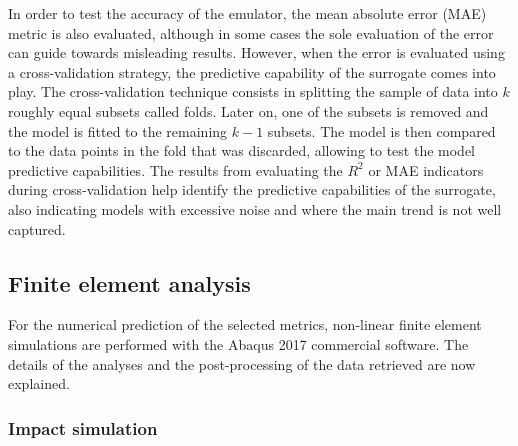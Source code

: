\documentclass[12pt,number,preprint,review,times]{elsarticle}
\begin{document}
\begin{itemize}
In order to test the accuracy of the emulator, the mean absolute error (MAE) metric is also evaluated, although in some cases the sole evaluation of the error can guide towards misleading results. However, when the error is evaluated using a cross-validation strategy, the predictive capability of the surrogate comes into play. The cross-validation technique consists in splitting the sample of data into $k$ roughly equal subsets called folds. Later on, one of the subsets is removed and the model is fitted to the remaining $k-1$ subsets. The model is then compared to the data points in the fold that was discarded, allowing to test the model predictive capabilities. The results from evaluating the $R^2$ or MAE indicators during cross-validation help identify the predictive capabilities of the surrogate, also indicating models with excessive noise and where the main trend is not well captured.




\end{itemize}

\subsection{Finite element analysis}

For the numerical prediction of the selected metrics, non-linear finite element simulations are performed with the Abaqus 2017 commercial software. The details of the analyses and the post-processing of the data retrieved are now explained.

\subsubsection{Impact simulation}
\end{document}
